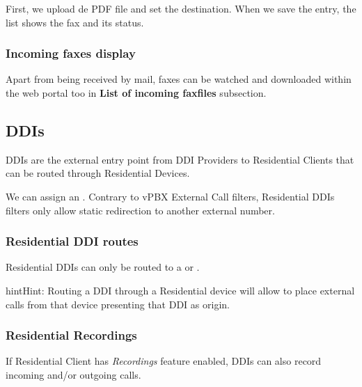 \documentclass[letterpaper,10pt,english]{sphinxmanual}
\begin{document}
First, we upload de PDF file and set the destination. When we save the entry, the list shows the fax and its status.


\subsubsection{Incoming faxes display}
\label{administration_portal/client/residential/faxes:incoming-faxes-display}
Apart from being received by mail, faxes can be watched and downloaded within
the web portal too in \textbf{List of incoming faxfiles} subsection.


\subsection{DDIs}
\label{administration_portal/client/residential/ddis:ddis}\label{administration_portal/client/residential/ddis:residential-ddis}\label{administration_portal/client/residential/ddis::doc}
DDIs are the external entry point from DDI Providers to Residential Clients that
can be routed through Residential Devices.

We can assign an {\hyperref[administration_portal/client/vpbx/routing_tools/external_call_filters:external\string-call\string-filters]{}}. Contrary to vPBX External Call filters, Residential DDIs
filters only allow static redirection to another external number.


\subsubsection{Residential DDI routes}
\label{administration_portal/client/residential/ddis:residential-ddi-routes}
Residential DDIs can only be routed to a {\hyperref[administration_portal/client/residential/residential_devices:residential\string-devices]{}}
or {\hyperref[administration_portal/client/vpbx/faxes:faxing\string-system]{}}.

\begin{notice}{hint}{Hint:}
Routing a DDI through a Residential device will allow to place external calls
from that device presenting that DDI as origin.
\end{notice}


\subsubsection{Residential Recordings}
\label{administration_portal/client/residential/ddis:residential-recordings}
If Residential Client has \emph{Recordings} feature enabled, DDIs can also record incoming and/or
outgoing calls.
\end{document}
